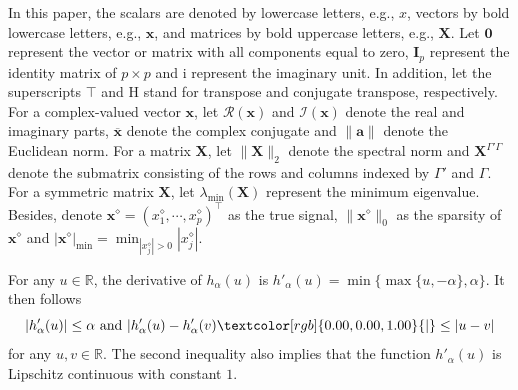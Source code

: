 \documentclass{article}
\numberwithin{equation}{section}
\begin{document}
In this paper, the scalars are denoted by lowercase letters, e.g., $x$, vectors by bold lowercase letters, e.g., $\mathbf{x}$, and matrices by bold uppercase letters, e.g., $\mathbf{X}$.
Let $\mathbf{0}$ represent the vector or matrix with all components equal to zero, $\mathbf{I}_p$ represent the identity matrix of $p\times p$ and $\mathrm{i}$ represent the imaginary unit. 
In addition, let the superscripts $\top$ and $\mathrm{H}$ stand for transpose and conjugate transpose, respectively.
For a complex-valued vector $\mathbf{x}$, let $\mathcal{R}(\mathbf{x})$ and $\mathcal{I}(\mathbf{x})$ denote the real and imaginary parts, $\overline{\mathbf{x}}$ denote the complex conjugate and $\|\mathbf{a}\|$ denote the Euclidean norm.
For a matrix $\mathbf{X}$, let $\|\mathbf{X}\|_2$ denote the spectral norm and $\mathbf{X}^{\Gamma'\Gamma}$ denote the submatrix consisting of the rows and columns indexed by $\Gamma'$ and $\Gamma$.
For a symmetric matrix $\mathbf{X}$, let $\lambda_{\mathrm{min}}(\mathbf{X})$ represent the minimum eigenvalue.  Besides, denote $\mathbf{x}^\diamond=(x_1^\diamond,\cdots,x_p^\diamond)^\top$ as the true signal, $\|\mathbf{x}^\diamond\|_{0}$ as the sparsity of $\mathbf{x}^\diamond$ and $|\mathbf{x}^\diamond|_{\mathrm{min}}=\min_{|x_j^\diamond|>0}|x_j^\diamond|$.

For any $u\in\mathbb{R}$, the derivative of $h_{\alpha}(u)$ is $h'_{\alpha}(u)=\min\{\max\{u,-\alpha \},\alpha\}$. It then follows
\begin{equation}\label{hd-Lip}
	|h'_{\alpha}(u)|\leq\alpha~\mbox{and}~|h'_{\alpha}(u)-h'_{\alpha}(v) \textcolor[rgb]{0.00,0.00,1.00}{|} \leq |u-v|
\end{equation}
for any $u, v\in\mathbb{R}$. The second inequality also implies that the function $h'_{\alpha}(u)$ is Lipschitz continuous with constant $1$. 
\end{document}

